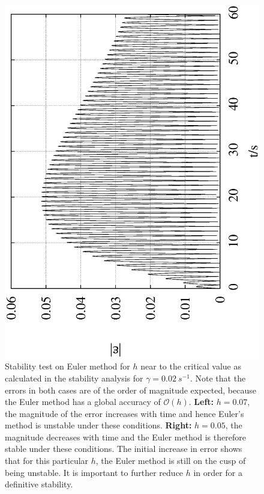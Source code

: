 \documentclass[10pt,a4paper]{article}
\begin{document}
\begin{figure}[h!]
\begin{center}
\includegraphics[scale = 0.3, angle =-90]{./Euler_0.05_10000_0.2.txt.eps}
\caption{Stability test on Euler method for $h$ near to the critical value as calculated in the stability analysis for $\gamma = 0.02\:s^{-1}$. Note that the errors in both cases are of the order of magnitude expected, because the Euler method has a global accuracy of $\mathcal{O}(h)$. \textbf{Left: }$h=0.07$, the magnitude of the error increases with time and hence Euler's method is unstable under these conditions. \textbf{Right: }$h=0.05$, the magnitude decreases with time and the Euler method is therefore stable under these conditions. The initial increase in error shows that for this particular $h$, the Euler method is still on the cusp of being unstable. It is important to further reduce $h$ in order for a definitive stability.}
\label{fig:EulerStability}
\end{center}
\end{figure}
\end{document}
